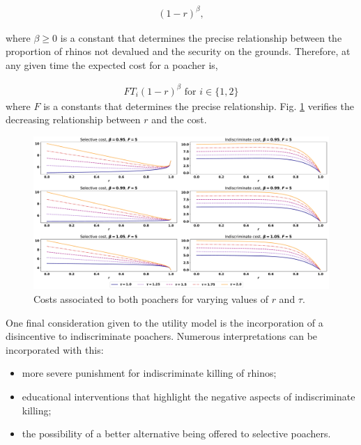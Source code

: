 \documentclass[10pt]{article}
\begin{document}
\begin{eqnarray}
    \label{eqn:risk}
    (1 - r)^{\beta},
\end{eqnarray}

where \(\beta \geq 0\) is a constant that determines the precise relationship
between the proportion of rhinos not devalued and the security on the grounds.
Therefore, at any given time the expected cost for a poacher is,

\begin{equation}
    \begin{split}
    \label{eqn:cost}
        FT_i(1 - r)^{\beta} \text{ for } i \in \{1, 2\}
    \end{split}
\end{equation}
where \(F\) is a constants that determines the precise relationship. Fig.
\ref{fig:CostCurves} verifies the decreasing relationship between \(r\) and the
cost.

\begin{figure}[!htbp]
    \begin{center}
        \includegraphics[width=\linewidth]{images/betas_curve.pdf}
        \caption{Costs associated to both poachers for varying values of \(r\)
        and \(\tau\).}\label{fig:CostCurves}
    \end{center}
\end{figure}

One final consideration given to the utility model is the incorporation of a
disincentive to indiscriminate poachers. Numerous interpretations can be
incorporated with this:

\begin{itemize}
    \item more severe punishment for indiscriminate killing of rhinos;
    \item educational interventions that highlight the negative aspects of
        indiscriminate killing;
    \item the possibility of a better alternative being offered to selective
        poachers.
\end{itemize}
\end{document}

